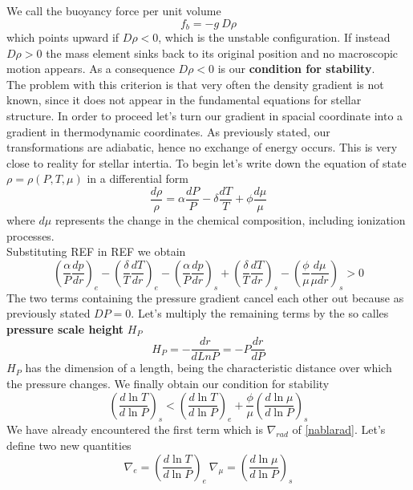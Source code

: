 \documentclass[11pt]{article}
\begin{document}
We call the buoyancy force per unit volume 
$$
f_b=- g \ D \rho
$$
which points upward if $D \rho < 0$, which is the unstable configuration. If instead $D \rho > 0$ the mass element sinks back to its original position and no macroscopic motion appears. As a consequence $D \rho<0$ is our \textbf{condition for stability}.\\
The problem with this criterion is that very often the density gradient is not known, since it does not appear in the fundamental equations for stellar structure. In order to proceed let's turn our gradient in spacial coordinate into a gradient in thermodynamic coordinates. As previously stated, our transformations are adiabatic, hence no exchange of energy occurs. This is very close to reality for stellar intertia. To begin let's write down the equation of state $\rho = \rho (P, T, \mu)$ in a differential form
\begin{equation}\label{EoSdiff}
	\frac{d \rho}{\rho} = \alpha \frac{d P}{P} - \delta \frac{d T}{T} + \phi \frac{d \mu}{\mu}
\end{equation}
where $d \mu$ represents the change in the chemical composition, including ionization processes. \\
Substituting REF in REF we obtain
\begin{equation}
	\left (\frac{\alpha}{P} \frac{dp}{dr}\right )_e - \left ( \frac{\delta}{T}\frac{dT}{dr}\right )_e -  \left (\frac{\alpha}{P} \frac{dp}{dr}\right )_s +  \left ( \frac{\delta}{T}\frac{dT}{dr}\right )_s -  \left ( \frac{\phi}{\mu}\frac{d \mu}{\mu dr}\right )_s>0 
\end{equation}
The two terms containing the pressure gradient cancel each other out because as previously stated $DP=0$. Let's multiply the remaining terms by the so calles \textbf{pressure scale height} $H_P$
\begin{equation}\label{scaleheight}
	H_P=-\frac{dr}{d Ln P}= - P \frac{dr}{dP}
\end{equation}
$H_P$ has the dimension of a length, being the characteristic distance over which the pressure changes.
We finally obtain our condition for stability
\begin{equation}\label{criterionstab}
	\left (   \frac{d \ln T}{d \ln P}    \right )_s <  \left (   \frac{d \ln T}{d \ln P}   \right )_e +  \frac{\phi}{\mu} \left (   \frac{d \ln \mu}{d \ln P}    \right )_s
\end{equation}
We have already encountered the first term which is $\nabla_{rad}$ of \ref{nablarad}.
Let's define two new quantities
\begin{equation}\label{nablas}
	\nabla_{e} = \left (  \frac{d \ln T}{d \ln P}   \right )_e \  \nabla_{\mu} = \left (  \frac{d \ln \mu}{d \ln P}   \right )_s
\end{equation}
\end{document}
